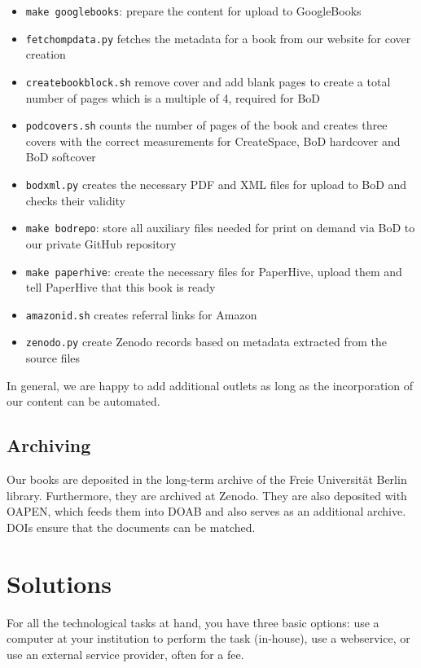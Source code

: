 \documentclass[guidelines,nonflat,modfonts] {langsci/langscibook}
\begin{document}
\begin{itemize}
 \item \texttt{make googlebooks}: prepare the content for upload to GoogleBooks 
 \item \texttt{fetchompdata.py} fetches the metadata for a book from our website for cover creation 
 \item \texttt{createbookblock.sh} remove cover and add blank pages to create a total number of pages which is a multiple of 4, required for BoD
 \item \texttt{podcovers.sh} counts the number of pages of the book and creates three covers with the correct measurements for CreateSpace, BoD hardcover and BoD softcover 
 \item \texttt{bodxml.py} creates the necessary PDF and XML files for upload to BoD and checks their validity
 \item \texttt{make bodrepo}: store all auxiliary files needed for print on demand via BoD to our private GitHub repository
 \item \texttt{make paperhive}: create the necessary files for PaperHive, upload them and tell PaperHive that this book is ready 
 \item \texttt{amazonid.sh} creates referral links for Amazon
 \item \texttt{zenodo.py} create Zenodo records based on metadata extracted from the source files 
\end{itemize}
 
In general, we are happy to add additional outlets as long as the incorporation of our content can be automated.  
 
   


\subsection{Archiving}
Our books are deposited in the long-term archive of the Freie Universität Berlin library. Furthermore, they are archived at Zenodo. They are also deposited with OAPEN, which feeds them into DOAB and also serves as an additional archive. DOIs ensure that the documents can be matched.

\section{Solutions}\label{sec:software}
For all the technological tasks at hand, you have three basic options: use a computer at your institution to perform the task (in-house), use a webservice, or use an external service provider, often for a fee. 
\end{document}
